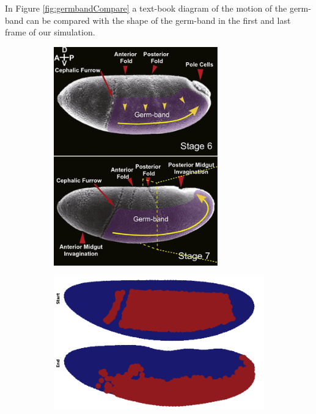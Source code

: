 In Figure \ref{fig:germbandCompare} a text-book diagram of the motion of the germ-band can be compared with the shape of the germ-band in the first and last frame of our simulation. 
\begin{figure}[H]
    \centering
    \begin{subfigure}[b]{0.3\textwidth}
        \includegraphics[width=\textwidth]{chapters/Results/figures/compareGB.png}
    \caption{}
    \end{subfigure}
    \begin{subfigure}[b]{0.61\textwidth}
    \includegraphics[width=\textwidth]{chapters/Results/figures/gb_firstframe_lastframe.png}

\end{subfigure}
\end{figure}
